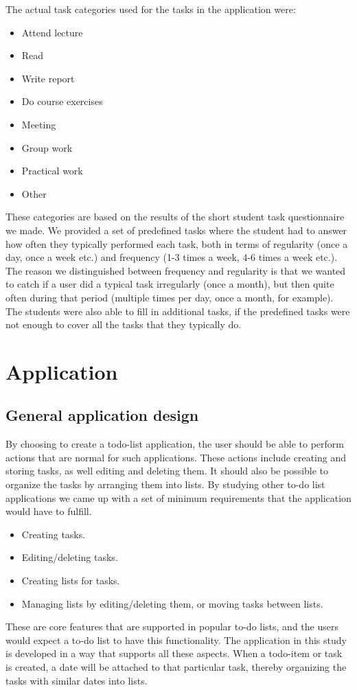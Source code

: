 The actual task categories used for the tasks in the application were:
\begin{itemize}
	\item Attend lecture
	\item Read
	\item Write report
	\item Do course exercises
	\item Meeting
	\item Group work
	\item Practical work
	\item Other
\end{itemize}
These categories are based on the results of the short student task questionnaire we made. We provided a set of predefined tasks where the student had to answer how often they typically performed each task, both in terms of regularity (once a day, once a week etc.) and frequency (1-3 times a week, 4-6 times a week etc.). The reason we distinguished between frequency and regularity is that we wanted to catch if a user did a typical task irregularly (once a month), but then quite often during that period (multiple times per day, once a month, for example). The students were also able to fill in additional tasks, if the predefined tasks were not enough to cover all the tasks that they typically do.



\section{Application}
\label{sec:application}

\subsection{General application design}
By choosing to create a todo-list application, the user should be able to perform actions that are normal for such applications. These actions include creating and storing tasks, as well editing and deleting them. It should also be possible to organize the tasks by arranging them into lists. By studying other to-do list applications \cite{trello, todoist} we came up with a set of minimum requirements that the application would have to fulfill.
\begin{itemize}
	\item Creating tasks.
	\item Editing/deleting tasks.
	\item Creating lists for tasks.
	\item Managing lists by editing/deleting them, or moving tasks between lists.
\end{itemize}
These are core features that are supported in popular to-do lists, and the users would expect a to-do list to have this functionality. The application in this study is developed in a way that supports all these aspects. When a todo-item or task is created, a date will be attached to that particular task, thereby organizing the tasks with similar dates into lists.


